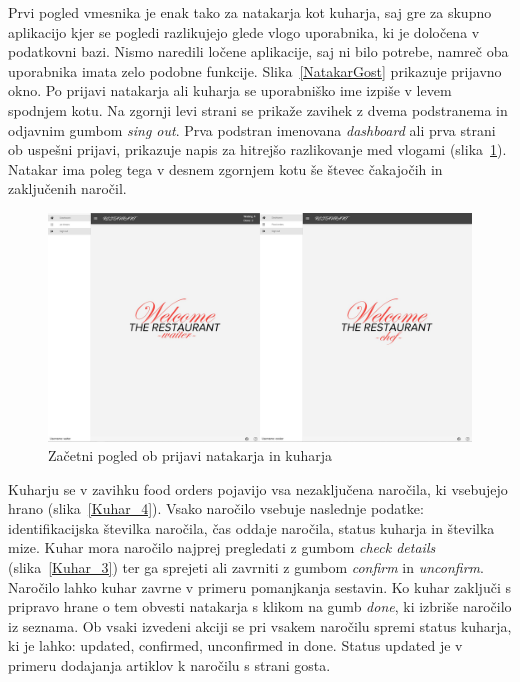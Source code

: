 \documentclass[a4paper, 12pt]{book}
\begin{document}
Prvi pogled vmesnika je enak tako za natakarja kot kuharja, saj gre za skupno aplikacijo kjer se pogledi razlikujejo glede vlogo uporabnika, ki je določena v podatkovni bazi. Nismo naredili ločene aplikacije, saj ni bilo potrebe, namreč oba uporabnika imata zelo podobne funkcije. Slika~\ref{NatakarGost} prikazuje prijavno okno. Po prijavi natakarja ali kuharja se uporabniško ime izpiše v levem spodnjem kotu. Na zgornji levi strani se prikaže zavihek z dvema podstranema in odjavnim gumbom \textit{sing out}. Prva podstran imenovana \textit{dashboard} ali prva strani ob uspešni prijavi, prikazuje napis za hitrejšo razlikovanje med vlogami (slika~\ref{Dvapogleda}). Natakar ima poleg tega v desnem zgornjem kotu še števec čakajočih in zaključenih naročil.

\begin{figure}[!htb]
\begin{center}
\includegraphics[width=14cm]{dvapogleda.jpg}
\caption{Začetni pogled ob prijavi natakarja in kuharja}
\label{Dvapogleda}
\end{center}
\end{figure}

Kuharju se v zavihku food orders pojavijo vsa nezaključena naročila, ki vsebujejo hrano (slika~\ref{Kuhar_4}). Vsako naročilo vsebuje naslednje podatke: identifikacijska številka naročila, čas oddaje naročila, status kuharja in številka mize. Kuhar mora naročilo najprej pregledati z gumbom \textit{check details} (slika~\ref{Kuhar_3}) ter ga sprejeti ali zavrniti z gumbom \textit{confirm} in \textit{unconfirm}. Naročilo lahko kuhar zavrne v primeru pomanjkanja sestavin. Ko kuhar zaključi s pripravo hrane o tem obvesti natakarja s klikom na gumb \textit{done}, ki izbriše naročilo iz seznama. Ob vsaki izvedeni akciji se pri vsakem naročilu spremi status kuharja, ki je lahko: updated, confirmed, unconfirmed in done. Status updated je v primeru dodajanja artiklov k naročilu s strani gosta.
\end{document}
